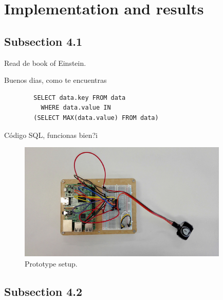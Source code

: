 \clearpage
\section{Implementation and results}
\label{sec:sect4}
\lipsum[8]
\subsection{Subsection 4.1}
\label{subsec:subsec4.1}
\lipsum[8]
Read de book \cite{einstein} of Einstein.

Buenos dias, como te encuentras
\begin{listing}[H]
	\begin{verbatim}
		SELECT data.key FROM data
		  WHERE data.value IN
		(SELECT MAX(data.value) FROM data)
	\end{verbatim}
	\caption{Código SQL, funcionas bien?i}
	\label{listings:como va esto}
\end{listing}




\begin{figure}[H]
\label{fig:prototype1}
\centering
\includegraphics[width=10cm]{img/Chapter4/prototype1_edited.jpg}
\caption[Prototype setup]{\footnotesize{Prototype setup.}}
\end{figure}

\lipsum[14]

\subsection{Subsection 4.2}
\label{subsec:subsec4.2}

